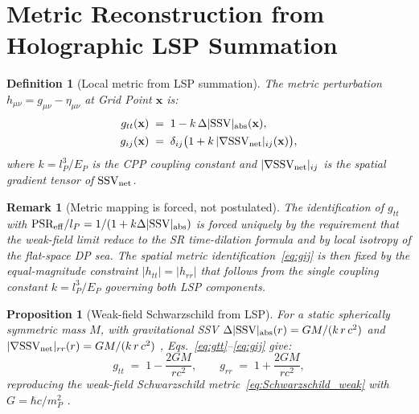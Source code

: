 \documentclass[12pt]{article}
\newtheorem{definition}[theorem]{Definition}
\newtheorem{proposition}[theorem]{Proposition}
\newtheorem{remark}[theorem]{Remark}
\newcommand{\lP}{l_P}
\newcommand{\EP}{E_P}
\newcommand{\mP}{m_P}
\newcommand{\SSV}{\text{SSV}}
\newcommand{\PSR}{\text{PSR}}
\newcommand{\gmn}{g_{\mu\nu}}
\newcommand{\hmn}{h_{\mu\nu}}
\begin{document}
\section{Metric Reconstruction from Holographic LSP Summation}
\label{sec:metric}

\begin{definition}[Local metric from LSP summation]
\label{def:metric}
The metric perturbation $\hmn = \gmn - \eta_{\mu\nu}$ at Grid Point
$\mathbf{x}$ is:
\begin{align}
  g_{tt}(\mathbf{x}) &\;=\; 1 - k\,\Delta|\SSV|_{\rm abs}(\mathbf{x}),
  \label{eq:gtt}\\
  g_{ij}(\mathbf{x}) &\;=\; \delta_{ij}\bigl(1 +
    k\,|\nabla\mathbf{\SSV}_{\rm net}|_{ij}(\mathbf{x})\bigr),
  \label{eq:gij}
\end{align}
where $k = \lP^3/\EP$ is the CPP coupling constant
\citep[Eq.~1]{abshier2026sr} and
$|\nabla\mathbf{\SSV}_{\rm net}|_{ij}$ is the spatial gradient tensor
of $\mathbf{\SSV}_{\rm net}$.
\end{definition}

\begin{remark}[Metric mapping is forced, not postulated]
\label{rem:forced}
The identification of $g_{tt}$ with $\PSR_{\rm eff}/\lP =
1/(1+k\Delta|\SSV|_{\rm abs})$ is forced uniquely by the requirement
that the weak-field limit reduce to the SR time-dilation formula
\citep[Eq.~1]{abshier2026sr} and by local isotropy of the flat-space
DP sea.  The spatial metric identification~\eqref{eq:gij} is then
fixed by the equal-magnitude constraint $|h_{tt}| = |h_{rr}|$ that
follows from the single coupling constant $k = \lP^3/\EP$ governing
both LSP components.
\end{remark}

\begin{proposition}[Weak-field Schwarzschild from LSP]
\label{prop:Schwarzschild}
For a static spherically symmetric mass $M$, with gravitational SSV
$\Delta|\SSV|_{\rm abs}(r) = GM/(k\,r\,c^2)$ and
$|\nabla\mathbf{\SSV}_{\rm net}|_{rr}(r) = GM/(k\,r\,c^2)$
\citep{abshier2026grav}, Eqs.~\eqref{eq:gtt}--\eqref{eq:gij} give:
\begin{equation}
  g_{tt} \;=\; 1 - \frac{2GM}{rc^2}, \qquad
  g_{rr} \;=\; 1 + \frac{2GM}{rc^2},
  \label{eq:Schwarzschild_CPP}
\end{equation}
reproducing the weak-field Schwarzschild metric~\eqref{eq:Schwarzschild_weak}
with $G = \hbar c/\mP^2$ \citep{abshier2026grav}.
\end{proposition}
\end{document}
